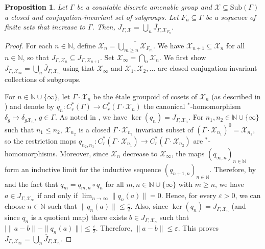 \documentclass[11pt, oneside, reqno]{amsart}
\newtheorem{prp}[thm]{Proposition}
\theoremstyle{definition}
\theoremstyle{remark}
\numberwithin{equation}{section}
\begin{document}
\begin{prp}
    \label{prp:inducsg}
    Let $\Gamma$ be a countable discrete amenable group and $\mathcal{X} \subseteq \text{Sub}(\Gamma)$ a closed and conjugation-invariant set of subgroups. Let $F_{n}\subseteq \Gamma$ be a sequence of finite sets that increase to $\Gamma$. Then, $J_{\Gamma,\mathcal{X}} = \overline{\bigcup_{n}J_{\Gamma,\mathcal{X}_{F_{n}}}}$.
\end{prp}
\begin{proof}
    For each $n\in\mathbb{N}$, define $\mathcal{X}_{n} = \overline{\bigcup_{m\geq n}\mathcal{X}_{F_{m}}}$. We have $\mathcal{X}_{n+1}\subseteq \mathcal{X}_{n}$ for all $n\in\mathbb{N}$, so that $J_{\Gamma, \mathcal{X}_{n}}\subseteq J_{\Gamma,\mathcal{X}_{n+1}}$. Set $\mathcal{X}_{\infty} = \bigcap_{n}\mathcal{X}_{n}$. We first show $J_{\Gamma,\mathcal{X}_{\infty}} = \overline{\bigcup_{n}J_{\Gamma, \mathcal{X}_{n}}}$ using that $\mathcal{X}_\infty$ and $\mathcal{X}_1, \mathcal{X}_2, \dots$ are closed conjugation-invariant collections of subgroups.
    
    For $n\in\mathbb{N}\cup\{\infty\}$, let $\Gamma\cdot\mathcal{X}_{n}$ be the \'etale groupoid of cosets of $\mathcal{X}_{n}$ (as described in \cite[Section~5.1]{Hume}) and denote by $q_{n}:C^{*}_{r}(\Gamma)\to C^{*}_{r}(\Gamma\cdot\mathcal{X}_{n})$ the canonical $^*$-homomorphism $\delta_{g}\mapsto \delta_{g\mathcal{X}_{n}}$, $g\in \Gamma$. As noted in \cite{Hume}, we have $\ker(q_{n}) = J_{\Gamma, \mathcal{X}_{n}}.$ For $n_{1}, n_{2}\in\mathbb{N}\cup\{\infty\}$ such that $n_{1}\leq n_{2}$, $\mathcal{X}_{n_2}$ is a closed $\Gamma\cdot\mathcal{X}_{n_1}$ invariant subset of $(\Gamma\cdot\mathcal{X}_{n_1})^{0} = \mathcal{X}_{n_1}$, so the restriction maps $q_{n_{2}, n_{1}}:C_{r}^{*}(\Gamma\cdot\mathcal{X}_{n_{1}})\to C_{r}^{*}(\Gamma\cdot\mathcal{X}_{n_{2}})$ are $^*$-homomorphisms. Moreover, since $\mathcal{X}_{n}$ decrease to $\mathcal{X}_{\infty}$, the maps $(q_{\infty,n})_{n\in\mathbb{N}}$ form an inductive limit for the inductive sequence $(q_{n+1,n})_{n\in\mathbb{N}}$. Therefore, by \cite[Proposition~6.2.4]{RL00} and the fact that $q_{m} = q_{m,n}\circ q_{n}$ for all $m, n\in\mathbb{N}\cup\{\infty\}$ with $m\geq n$, we have $a\in J_{\Gamma,\mathcal{X}_{\infty}}$ if and only if $\lim_{n\to\infty}\|q_{n}(a)\| = 0$. Hence, for every $\varepsilon > 0$, we can choose $n\in\mathbb{N}$ such that $\|q_{n}(a)\|\leq \frac{\varepsilon}{2}$. Also, since $\ker(q_n) = J_{\Gamma, \mathcal{X}_n}$ (and since $q_{n}$ is a quotient map) there exists $b\in J_{\Gamma,\mathcal{X}_{n}}$ such that $\big|\|a - b\| - \|q_{n}(a)\|\big |\leq \frac{\varepsilon}{2}$. Therefore, $\|a - b\|\leq \varepsilon$. This proves $J_{\Gamma,\mathcal{X}_{\infty}} = \overline{\bigcup_{n}J_{\Gamma, \mathcal{X}_{n}}}$.


\end{proof}
\end{document}
